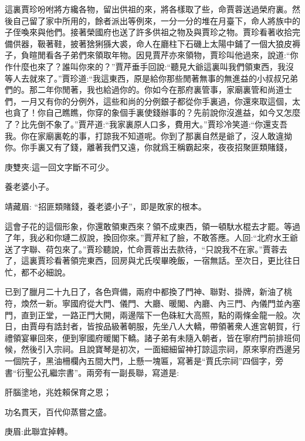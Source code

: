 \begin{parag}
    這裏賈珍吩咐將方纔各物，留出供祖的來，將各樣取了些，命賈蓉送過榮府裏。然後自己留了家中所用的，餘者派出等例來，一分一分的堆在月臺下，命人將族中的子侄喚來與他們。接著榮國府也送了許多供祖之物及與賈珍之物。賈珍看著收拾完備供器，靸著鞋，披著猞猁猻大裘，命人在廳柱下石磯上太陽中鋪了一個大狼皮褥子，負暄閒看各子弟們來領取年物。因見賈芹亦來領物，賈珍叫他過來，說道:“你作什麼也來了？誰叫你來的？”賈芹垂手回說:“聽見大爺這裏叫我們領東西，我沒等人去就來了。”賈珍道:“我這東西，原是給你那些閒著無事的無進益的小叔叔兄弟們的。那二年你閒著，我也給過你的。你如今在那府裏管事，家廟裏管和尚道士們，一月又有你的分例外，這些和尚的分例銀子都從你手裏過，你還來取這個，太也貪了！你自己瞧瞧，你穿的象個手裏使錢辦事的？先前說你沒進益，如今又怎麼了？比先倒不象了。”賈芹道:“我家裏原人口多，費用大。”賈珍冷笑道:“你還支吾我。你在家廟裏乾的事，打諒我不知道呢。你到了那裏自然是爺了，沒人敢違拗你。你手裏又有了錢，離著我們又遠，你就爲王稱霸起來，夜夜招聚匪類賭錢，\begin{note}庚雙夾:這一回文字斷不可少。\end{note}養老婆小子。\begin{note}靖藏眉: “招匪類賭錢，養老婆小子”，即是敗家的根本。\end{note}這會子花的這個形象，你還敢領東西來？領不成東西，領一頓馱水棍去才罷。等過了年，我必和你璉二叔說，換回你來。”賈芹紅了臉，不敢答應。人回:“北府水王爺送了字聯、荷包來了。”賈珍聽說，忙命賈蓉出去款待，“只說我不在家。”賈蓉去了，這裏賈珍看著領完東西，回房與尤氏喫畢晚飯，一宿無話。至次日，更比往日忙，都不必細說。
\end{parag}


\begin{parag}
    已到了臘月二十九日了，各色齊備，兩府中都換了門神、聯對、掛牌，新油了桃符，煥然一新。寧國府從大門、儀門、大廳、暖閣、內廳、內三門、內儀門並內塞門，直到正堂，一路正門大開，兩邊階下一色硃紅大高照，點的兩條金龍一般。次日，由賈母有誥封者，皆按品級著朝服，先坐八人大轎，帶領著衆人進宮朝賀，行禮領宴畢回來，便到寧國府暖閣下轎。諸子弟有未隨入朝者，皆在寧府門前排班伺候，然後引入宗祠。且說寶琴是初次，一面細細留神打諒這宗祠，原來寧府西邊另一個院子，黑油柵欄內五間大門，上懸一塊匾，寫著是“賈氏宗祠”四個字，旁書“衍聖公孔繼宗書”。兩旁有一副長聯，寫道是:
\end{parag}


\begin{poem}
    \begin{pl}肝腦塗地，兆姓賴保育之恩；\end{pl}

    \begin{pl}功名貫天，百代仰蒸嘗之盛。\end{pl}
    \begin{note}庚眉:此聯宜掉轉。\end{note}
\end{poem}



